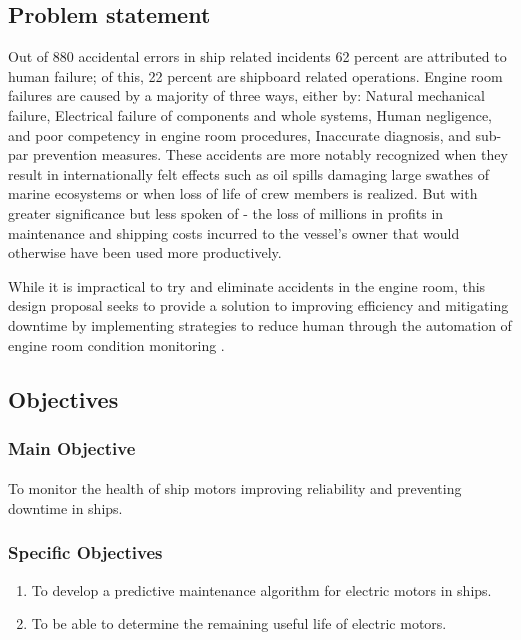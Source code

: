 \subsection{Problem  statement}
 Out of 880 accidental errors in ship related incidents 62 percent are attributed to human failure; of this, 22 percent are shipboard related operations. Engine room failures are caused by a majority of three ways, either by: Natural mechanical failure, Electrical failure of components and whole systems, Human negligence, and poor competency in engine room procedures, Inaccurate diagnosis, and sub-par prevention measures. These accidents are more notably recognized when they result in internationally felt effects such as oil spills damaging large swathes of marine ecosystems or when loss of life of crew members is realized. But with greater significance but less spoken of - the loss of millions in profits in maintenance and shipping costs incurred to the vessel’s owner that would otherwise have been used more productively.
 
  While it is impractical to try and eliminate accidents in the engine room, this design proposal seeks to provide a solution to improving efficiency and mitigating downtime by implementing strategies to reduce human through the automation of engine room condition monitoring \cite{noauthor_13_nodate}. 


\subsection{Objectives}
\subsubsection{Main Objective}
\paragraph{}  To monitor the health of ship motors improving reliability and preventing downtime
in ships. 
\subsubsection{Specific Objectives}
\begin{enumerate}
\item  To develop a predictive maintenance algorithm for electric motors in ships.
\item To be able to determine the remaining useful life of electric motors. 

\end{enumerate}
